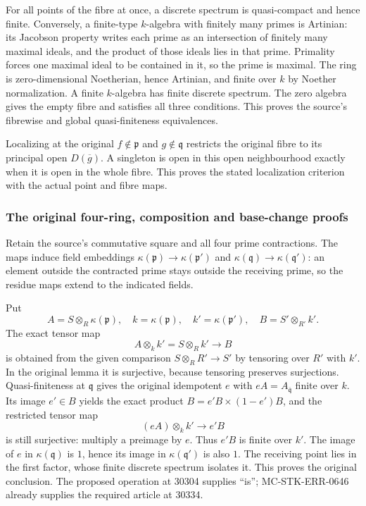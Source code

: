 For all points of the fibre at once, a discrete spectrum is quasi-compact and hence finite. Conversely, a finite-type \(k\)-algebra with finitely many primes is Artinian: its Jacobson property writes each prime as an intersection of finitely many maximal ideals, and the product of those ideals lies in that prime. Primality forces one maximal ideal to be contained in it, so the prime is maximal. The ring is zero-dimensional Noetherian, hence Artinian, and finite over \(k\) by Noether normalization. A finite \(k\)-algebra has finite discrete spectrum. The zero algebra gives the empty fibre and satisfies all three conditions. This proves the source's fibrewise and global quasi-finiteness equivalences.

Localizing at the original \(f\notin\mathfrak p\) and \(g\notin\mathfrak q\) restricts the original fibre to its principal open \(D(\overline g)\). A singleton is open in this open neighbourhood exactly when it is open in the whole fibre. This proves the stated localization criterion with the actual point and fibre maps.

\subsubsection{The original four-ring, composition and base-change proofs}\label{algebra-proof-031-the-original-four-ring-composition-and-base-change-proofs}

Retain the source's commutative square and all four prime contractions. The maps induce field embeddings \(\kappa(\mathfrak p)\to\kappa(\mathfrak p')\) and \(\kappa(\mathfrak q)\to\kappa(\mathfrak q')\): an element outside the contracted prime stays outside the receiving prime, so the residue maps extend to the indicated fields.

Put \[
 A=S\otimes_R\kappa(\mathfrak p),\quad
 k=\kappa(\mathfrak p),\quad k'=\kappa(\mathfrak p'),\quad
 B=S'\otimes_{R'}k'.
\] The exact tensor map \[
 A\otimes_k k'=S\otimes_R k'\longrightarrow B
\] is obtained from the given comparison \(S\otimes_RR'\to S'\) by tensoring over \(R'\) with \(k'\). In the original lemma it is surjective, because tensoring preserves surjections. Quasi-finiteness at \(\mathfrak q\) gives the original idempotent \(e\) with \(eA=A_{\overline{\mathfrak q}}\) finite over \(k\). Its image \(e'\in B\) yields the exact product \(B=e'B\times(1-e')B\), and the restricted tensor map \[
 (eA)\otimes_k k'\longrightarrow e'B
\] is still surjective: multiply a preimage by \(e\). Thus \(e'B\) is finite over \(k'\). The image of \(e\) in \(\kappa(\mathfrak q)\) is \(1\), hence its image in \(\kappa(\mathfrak q')\) is also \(1\). The receiving point lies in the first factor, whose finite discrete spectrum isolates it. This proves the original conclusion. The proposed operation at 30304 supplies ``is''; MC-STK-ERR-0646 already supplies the required article at 30334.

